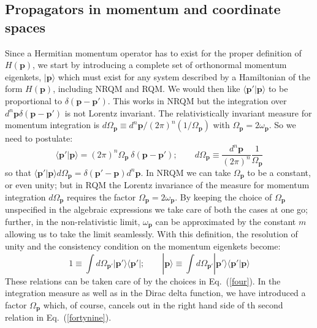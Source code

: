 \documentclass[12pt]{article}
\def\eq#1{{Eq.~(\ref{#1})}}
\def\ket#1{|#1\rangle}                    %
\def\bra#1{\langle #1|}                   %
\def\amp#1#2{\langle #1 | #2\rangle}      %
\begin{document}
  \subsection{Propagators in momentum and coordinate spaces}
 
 Since a Hermitian momentum operator has  to exist for the proper definition of $ H(\bm{p})$, we start by introducing a complete set of orthonormal momentum eigenkets, $\ket{\bm{p}}$ which must exist for any system described by a Hamiltonian of the form $ H(\bm{p})$, including NRQM and RQM. We would then like $\amp{\bm{p}'}{\bm{p}}$ to be proportional to $\delta (\bm{p}- \bm{p}')$. This works in NRQM but the integration over $d^n\bm{p}\delta (\bm{p}- \bm{p}')$ is not Lorentz invariant. The relativistically invariant measure for momentum integration is $d\Omega_{\bm{p}} \equiv d^n \bm{p}/(2\pi)^n (1/\Omega_{\bm{p}})$ with $\Omega_{\bm{p}} = 2\omega_{\bm{p}}$. So we need to  postulate:
 \begin{equation}
 \amp{\bm{p}'}{\bm{p}} = (2\pi)^n \Omega_{\bm{p}}\ \delta (\bm{p}- \bm{p}'); \qquad d\Omega_{\bm{p}} \equiv \frac{d^n \bm{p}}{(2\pi)^n} \frac{1}{\Omega_{\bm{p}}}
 \label{four}
\end{equation} 
so that $\amp{\bm{p}'}{\bm{p}} d\Omega_{\bm{p}} = \delta (\bm{p}'- \bm{p}) d^n \bm{p}$.
 In NRQM we can take $\Omega_{\bm{p}}$ to be a constant, or even unity; but in RQM the Lorentz invariance of the measure for momentum integration $d\Omega_{\bm{p}}$ requires the factor
 $\Omega_{\bm{p}} = 2\omega_{\bm{p}}$. By keeping the choice of $\Omega_{\bm{p}}$ unspecified in the algebraic expressions we take care of both the cases at one go; further, in the non-relativistic limit, $\omega_{\bm{p}}$ can be approximated by the constant $m$ allowing us to take the limit seamlessly. 
 With this definition, the resolution of unity and the consistency condition on the momentum eigenkets become:
 \begin{equation}
1 \equiv \int d\Omega_{\bm{p}'} \ket{\bm{p}'}\bra{\bm{p}'};\qquad 
\ket{ \bm{p}} \equiv \int d\Omega_{\bm{p}'} \ket{\bm{p}'}\amp{\bm{p}'}{\bm{p}}
\label{fortynine}
\end{equation} 
 These relations can be taken care of by the choices in \eq{four}.
 In the integration measure as well as in the Dirac delta function, we have introduced a factor $\Omega_{\bm{p}}$ which, of course, cancels out in the right hand side of th second relation in \eq{fortynine}. 
 
\end{document}
